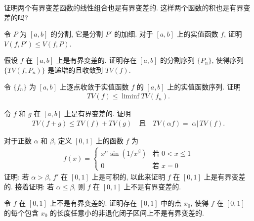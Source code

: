 \documentclass[../../main.tex]{subfiles}
\begin{document}
\begin{exercise}\label{exercise:ch06-30}
证明两个有界变差函数的线性组合也是有界变差的. 这样两个函数的积也是有界变差的吗?
\end{exercise}

\begin{exercise}\label{exercise:ch06-31}
令 $P$ 为 $[a,b]$ 的分割, 它是分割 $P'$ 的加细. 对于 $[a,b]$ 上的实值函数 $f$, 证明 $V(f,P')\leqslant V(f,P)$.
\end{exercise}

\begin{exercise}\label{exercise:ch06-32}
假设 $f$ 在 $[a,b]$ 上是有界变差的. 证明存在 $[a,b]$ 的分割序列 $\{P_{n}\}$, 使得序列 $\{TV(f,P_{n})\}$ 是递增的且收敛到 $TV(f)$.
\end{exercise}

\begin{exercise}\label{exercise:ch06-33}
令 $\{f_{n}\}$ 为 $[a,b]$ 上逐点收敛于实值函数 $f$ 的 $[a,b]$ 上的实值函数序列. 证明
\begin{align*}
TV(f)\leqslant\liminf TV(f_{n}).
\end{align*}
\end{exercise}

\begin{exercise}\label{exercise:ch06-34}
令 $f$ 和 $g$ 在 $[a,b]$ 上是有界变差的. 证明
\begin{align*}
TV(f+g)\leqslant TV(f)+TV(g)\quad\text{且}\quad TV(\alpha f)=|\alpha|\,TV(f).
\end{align*}
\end{exercise}

\begin{exercise}\label{exercise:ch06-35}
对于正数 $\alpha$ 和 $\beta$, 定义 $[0,1]$ 上的函数 $f$ 为
\begin{align*}
f(x)=
\begin{cases}
x^{\alpha}\sin(1/x^{\beta})&\text{若 }0<x\leqslant 1\\
0&\text{若 }x=0
\end{cases}
\end{align*}
证明: 若 $\alpha>\beta$, $f'$ 在 $[0,1]$ 上是可积的, 以此来证明 $f$ 在 $[0,1]$ 上是有界变差的. 接着证明: 若 $\alpha\leqslant\beta$, 则 $f$ 在 $[0,1]$ 上不是有界变差的.
\end{exercise}

\begin{exercise}\label{exercise:ch06-36}
令 $f$ 在 $[0,1]$ 上不是有界变差的. 证明存在 $[0,1]$ 中的点 $x_{0}$, 使得 $f$ 在 $[0,1]$ 的每个包含 $x_{0}$ 的长度任意小的非退化闭子区间上不是有界变差的.
\end{exercise}
\end{document}
